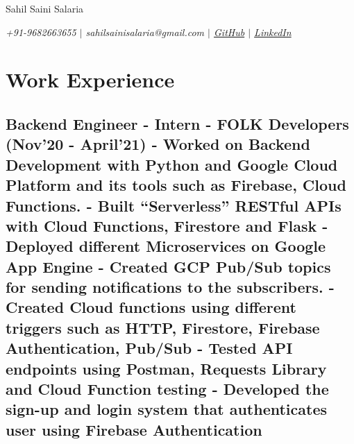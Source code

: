 \documentclass{article}
\makeatletter
\renewcommand{\maketitle}{
    \begin{flushleft}        
        {\huge\rmfamily
        \theauthor}\newline
        \vspace{0.1em}
        \textit{Email: sahilsainisalaria@gmail.com }  \newline  
        \textit{Contact: +91 9682663655 }  \newline 
        \textit{Address: Jammu, Jammu \& Kashmir }  \newline 
        \textit{ \href{https://github.com/sahil1515}{GitHub}}  \newline 
    \end{flushleft}
}
\makeatother
\begin{document}



\begin{center}
    \huge{Sahil Saini Salaria}

    \normalsize{
        \textit{
            +91-9682663655 \(|\)
            sahilsainisalaria@gmail.com \(|\)
            \href{https://www.github.com/sahil1515}{GitHub} \(|\)
            \href{https://www.linkedin.com/in/sahil-saini-39517a186/}{LinkedIn}
        }}
\end{center}


\section{Work Experience}

\subsection{\textbf{Backend Engineer - Intern}
    \textmd{- FOLK Developers (Nov'20 - April'21)}\newline
    \textmd{- Worked on Backend Development with Python and Google Cloud Platform and its tools such as Firebase, Cloud Functions. }\newline
    \textmd{- Built “Serverless” RESTful APIs with Cloud Functions, Firestore and Flask}\newline
    \textmd{- Deployed different Microservices on Google App Engine}\newline
    \textmd{- Created GCP Pub/Sub topics for sending notifications to the subscribers.}\newline
    \textmd{- Created Cloud functions using different triggers such as HTTP, Firestore, Firebase Authentication, Pub/Sub}\newline
    \textmd{- Tested API endpoints using Postman, Requests Library and Cloud Function testing}\newline
    \textmd{- Developed the sign-up and login system that authenticates user using Firebase Authentication}\newline
}
\end{document}
